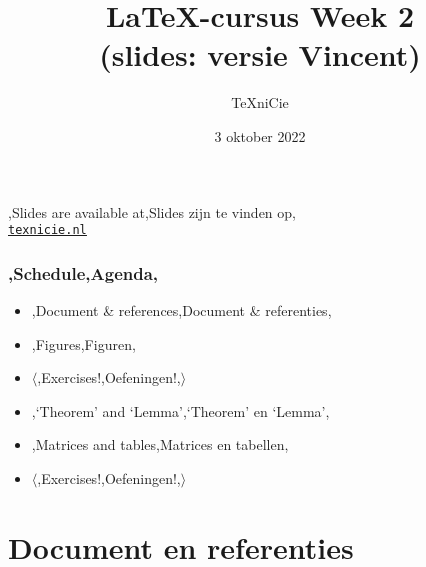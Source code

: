 \documentclass[
    dutch,
    everyoneauthor=true,
    darktheme,
    defaultSlideCollection=vincent,
    slidenames=true
]{../../cursuspresentatie}
\title[\LaTeX{}-cursus Week 2]{\LaTeX{}-cursus Week 2\\(slides: versie Vincent)}
\author{\TeX niCie}
\date{3 oktober 2022}
\begin{document}

\begin{frame}
    \titlepage
    \centering

    {\Large\lang,Slides are available at,Slides zijn te vinden op,\\
    \href{https://texnicie.nl}{\ul{\texttt{texnicie.nl}}}}
\end{frame}

\setul{1pt}{2pt}

\begin{frame}
    \frametitle{\lang,Schedule,Agenda,}
    
    \begin{itemize}
        \item \lang,Document \& references,Document \& referenties,
        \item \lang,Figures,Figuren,
        \item $ \langle $\lang,Exercises!,Oefeningen!,$ \rangle $
        \item \lang,`Theorem' and `Lemma',`Theorem' en `Lemma',
        \item \lang,Matrices and tables,Matrices en tabellen,
        \item $ \langle $\lang,Exercises!,Oefeningen!,$ \rangle $
    \end{itemize}
\end{frame}

\section{Document en referenties}


\end{document}
